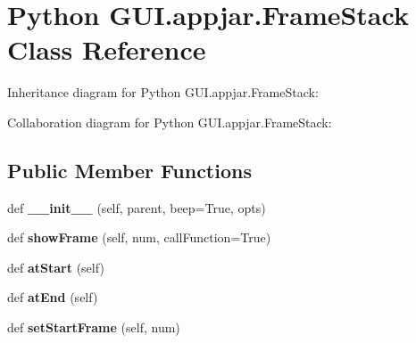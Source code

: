 \hypertarget{class_python_01_g_u_i_1_1appjar_1_1_frame_stack}{}\section{Python G\+U\+I.\+appjar.\+Frame\+Stack Class Reference}
\label{class_python_01_g_u_i_1_1appjar_1_1_frame_stack}


Inheritance diagram for Python G\+U\+I.\+appjar.\+Frame\+Stack\+:


Collaboration diagram for Python G\+U\+I.\+appjar.\+Frame\+Stack\+:
\subsection*{Public Member Functions}
\begin{DoxyCompactItemize}
\item 
\mbox{\label{class_python_01_g_u_i_1_1appjar_1_1_frame_stack_abef649073b291cc6281166842e863b4e}} 
def {\bfseries \+\_\+\+\_\+init\+\_\+\+\_\+} (self, parent, beep=True, opts)
\item 
\mbox{\label{class_python_01_g_u_i_1_1appjar_1_1_frame_stack_a414e1a50695de04eb9551fec09062510}} 
def {\bfseries show\+Frame} (self, num, call\+Function=True)
\item 
\mbox{\label{class_python_01_g_u_i_1_1appjar_1_1_frame_stack_ae48a44b54c89c03fe369db541dbd68ef}} 
def {\bfseries at\+Start} (self)
\item 
\mbox{\label{class_python_01_g_u_i_1_1appjar_1_1_frame_stack_ad85d6ad82a524a05a6f39e84d46f1040}} 
def {\bfseries at\+End} (self)
\item 
\mbox{\label{class_python_01_g_u_i_1_1appjar_1_1_frame_stack_a51b4da5fa4296e367b44e15c79e3d6e2}} 
def {\bfseries set\+Start\+Frame} (self, num)
\item 
\mbox{\label{class_python_01_g_u_i_1_1appjar_1_1_frame_stack_a7535f78a3f17366cae4c37b180ed954d}} 

\end{DoxyCompactItemize}
